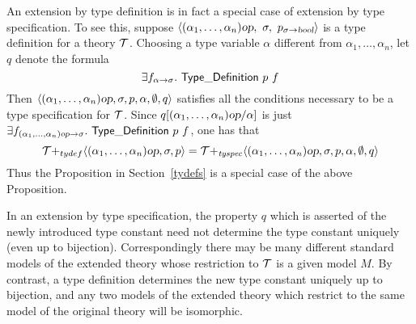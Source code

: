 \medskip

An extension by type definition is in fact a special case of extension
by type specification. To see this, suppose
$\langle (\alpha_1,\ldots,\alpha_n)\ty{op},\ \sigma,\
p_{\sigma\fun\ty{bool}}\rangle$ is a type definition for a theory
$\cal T$. Choosing a type variable $\alpha$ different from
$\alpha_1,\ldots,\alpha_n$, let $q$ denote the formula
\[
\exists f_{\alpha{\to}\sigma}.\ {\sf Type\_Definition}\ p\ f
\]
Then $\langle
(\alpha_1,\ldots,\alpha_n)\textsl{op},\sigma,p,\alpha,\emptyset,q\rangle$
satisfies all the conditions necessary to be a type specification for
$\cal T$. Since $q[(\alpha_1,\ldots,\alpha_n)\textsl{op}/\alpha]$ is just
$\exists f_{(\alpha_1,\ldots,\alpha_n)\textsl{op}{\to}\sigma}.\ {\sf
Type\_Definition}\ p\ f$, one has that
\[
{\cal T}{+_{tydef}}
\langle(\alpha_1,\ldots,\alpha_n)\textsl{op},\sigma,p\rangle
={\cal T}{+_{\it tyspec}}
\langle(\alpha_1,\ldots,\alpha_n)\textsl{op},\sigma,p,\alpha,\emptyset,q\rangle
\]
Thus the Proposition in Section~\ref{tydefs} is a special case of the
above Proposition.

In an extension by type specification, the property $q$ which is
asserted of the newly introduced type constant need not determine the
type constant uniquely (even up to bijection). Correspondingly there
may be many different standard models of the extended theory whose
restriction to $\cal T$ is a given model $M$. By contrast, a type
definition determines the new type constant uniquely up to bijection,
and any two models of the extended theory which restrict to the same
model of the original theory will be isomorphic.



